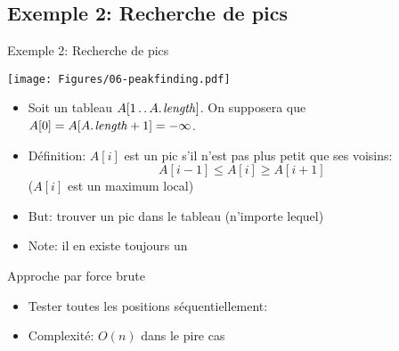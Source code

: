 \subsection{Exemple 2: Recherche de pics}

\begin{frame}{Exemple 2: Recherche de pics}

\centerline{\texttt{[image: Figures/06-peakfinding.pdf]}}

\bigskip

\begin{itemize}
\item Soit un tableau $A[1\twodots \attrib{A}{length}]$. On supposera
  que $A[0]=A[\attrib{A}{length}+1]=-\infty$.
\item Définition: $A[i]$ est un \alert{pic} s'il n'est pas plus petit que ses voisins:
$$A[i-1]\leq A[i]\geq A[i+1]$$
($A[i]$ est un maximum local)
\item \alert{But:} trouver un pic dans le tableau (n'importe lequel)
\item Note: il en existe toujours un
\end{itemize}

\end{frame}

\begin{frame}{Approche par force brute}
\begin{itemize}
\item Tester toutes les positions séquentiellement:

\bigskip

\begin{center}
{\small
{}
}
\end{center}

\bigskip

\item Complexité: $O(n)$ dans le pire cas
\end{itemize}

\end{frame}

